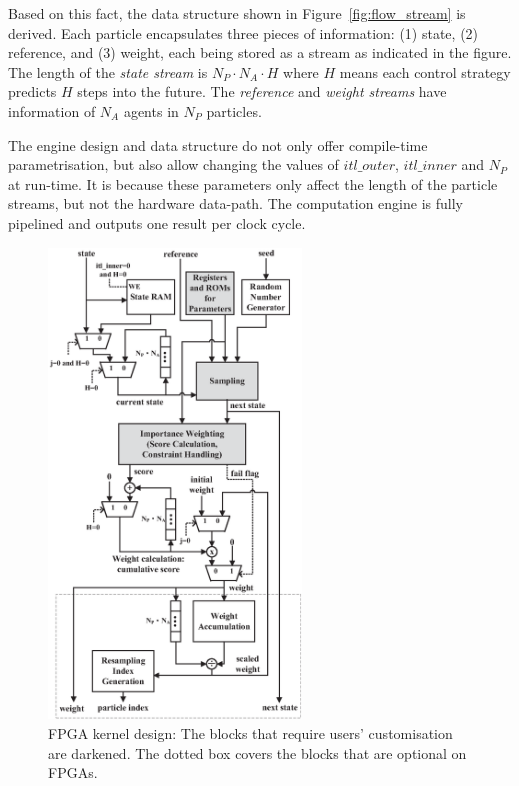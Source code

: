 Based on this fact, the data structure shown in Figure~\ref{fig:flow_stream} is derived.
Each particle encapsulates three pieces of information: (1) state, (2) reference, and (3) weight, each being stored as a stream as indicated in the figure.
The length of the \textit{state stream} is $N_P \cdot N_A \cdot H$ where $H$ means each control strategy predicts $H$ steps into the future.
The \textit{reference} and \textit{weight streams} have information of $N_A$ agents in $N_P$ particles.

The engine design and data structure do not only offer compile-time parametrisation, but also allow changing the values of $itl\_outer$, $itl\_inner$ and $N_P$ at run-time.
It is because these parameters only affect the length of the particle streams, but not the hardware data-path.
The computation engine is fully pipelined and outputs one result per clock cycle.

\begin{figure}[t!]
\begin{center}
\includegraphics[width=0.6\textwidth]{5_tool/figures/kernel}
\end{center}
\caption{FPGA kernel design: The blocks that require users' customisation are darkened. The dotted box covers the blocks that are optional on FPGAs.}
\label{fig:flow_kernel}
\end{figure}

